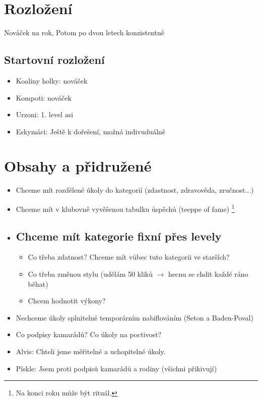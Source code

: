 \documentclass {article}
\begin{document}
\section{Rozložení} %
\label{sec:rozlozeni}
	
	Nováček na rok,
	Potom po dvou letech konzistentně
	\subsection{Startovní rozložení} %
	\label{sub:start}
		\begin{itemize}
			\item Koaliny holky: nováček
			\item Kompoti: nováček
			\item Urzoni: 1. level asi
			\item Eskymáci: Ještě k  dořešení, možná indivuduálně
		\end{itemize}




\section{Obsahy a přidružené} %
\label{sec:obsahy}
	\begin{itemize}
		\item Chceme mít rozdělené úkoly do kategorií (zdastnost, zdravověda, zručnost...)
		\item Chceme mít v klubovně vyvěšenou tabulku ůspěchů (teeppe of fame) \footnote{Na konci roku může být rituál.}
		\item
	
	\subsection{Chceme mít kategorie fixní přes levely} %
	\label{sub:chceme_kategorie_fixni_pres_levely}
	\begin{itemize}
		\item Co třeba zdatnost? Chceme mít vůbec tuto kategorii ve starších?
		\item Co třeba změnou stylu (udělám 50 kliků $\rightarrow$ hecnu se chdit každé ráno běhat)
		\item Chcem hodnotit výkony? 

	\end{itemize}
		\item Nechceme úkoly splnitelné temporárním nabiflováním (Seton a Baden-Poval)
		\item Co podpisy kamarádů? Co úkoly na poctivost?
		\item Alvis: Chteli jsme měřitelné a uchopitelné úkoly.
		\item Pískle: Jsem proti podpisů kamarádů a rodiny (všichni přikivují)
		\end{itemize}
\end{document}
